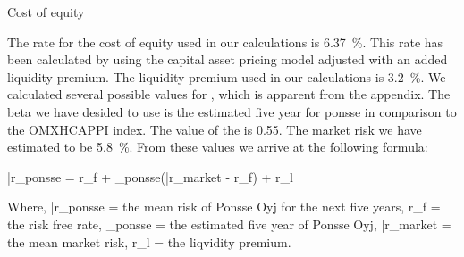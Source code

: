Cost of equity

The rate for the cost of equity used in our calculations is 6.37~\%. This rate has been calculated by using the capital asset pricing model adjusted with an added liquidity premium. The liquidity premium used in our calculations is 3.2~\%. We calculated several possible values for \beta, which is apparent from the appendix. The beta we have desided to use is the estimated five year \beta for ponsse in comparison to the OMXHCAPPI index. The value of the \beta is 0.55. The market risk we have estimated to be 5.8~\%. From these values we arrive at the following formula:

\bar{r}_{ponsse} = r_{f} + \hat{\beta} _{ponsse}(\bar{r}_{market} - r_{f}) + r_{l}

Where,
\bar{r}_{ponsse} = the mean risk of Ponsse Oyj for the next five years,
r_{f} = the risk free rate,
\hat{\beta}_{ponsse} = the estimated five year \beta of Ponsse Oyj,
\bar{r}_{market} = the mean market risk,
r_{l} = the liqvidity premium.

